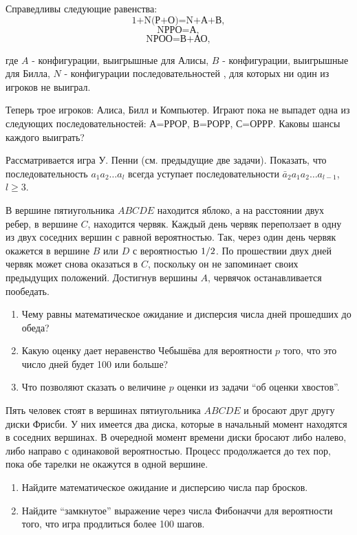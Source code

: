 \begin{ordre}

Справедливы следующие равенства:
\[
\mbox{1+N(Р+О)=N+А+В},
\]
\[
\mbox{NРРО=А},
\]
\[
\mbox{NРОО=В+АО},
\]

где $A$ - конфигурации, выигрышные для Алисы, $B$ -  конфигурации, выигрышные для Билла, $N$ - конфигурации последовательностей , для которых ни один из игроков не выиграл.

\end{ordre}


\begin{problem}
Теперь трое игроков: Алиса, Билл и Компьютер. Играют пока 
не выпадет одна из следующих последовательностей: А=РРОР, В=РОРР, С=ОРРР. 
Каковы шансы каждого выиграть?
\end{problem}


\begin{problem}
Рассматривается игра У. Пенни (см. предыдущие две задачи). Показать, что 
последовательность $a_1 a_2 \ldots a_l $ всегда уступает последовательности 
$\bar {a}_2 a_1 a_2 \ldots a_{l-1} $, $l\ge 3$.
\end{problem}


\begin{problem}
В вершине пятиугольника $ABCDE$ 
находится яблоко, а на расстоянии двух ребер, в вершине $C$, находится 
червяк. Каждый день червяк переползает в одну из двух соседних вершин с 
равной вероятностью. Так, через один день червяк окажется в вершине $B$ или 
$D$ с вероятностью $1 \mathord{\left/ {\vphantom {1 2}} \right. 
\kern-\nulldelimiterspace} 2$. По прошествии двух дней червяк может снова 
оказаться в $C$, поскольку он не запоминает своих предыдущих положений. 
Достигнув вершины $A$, червячок останавливается пообедать.

\begin{enumerate}
\item Чему равны математическое ожидание и дисперсия числа дней прошедших до обеда?
\item Какую оценку дает неравенство Чебышёва для вероятности $p$ того, что это число дней будет 100 или больше?
\item Что позволяют сказать о величине $p$ оценки из задачи ``об оценки хвостов''.
\end{enumerate}
\end{problem}


\begin{problem}
Пять человек стоят в вершинах пятиугольника $ABCDE$ и 
бросают друг другу диски Фрисби. У них имеется два диска, которые в 
начальный момент находятся в соседних вершинах. В очередной момент времени 
диски бросают либо налево, либо направо с одинаковой вероятностью. Процесс 
продолжается до тех пор, пока обе тарелки не окажутся в одной вершине.

\begin{enumerate}
\item Найдите математическое ожидание и дисперсию числа пар бросков.
\item Найдите ``замкнутое'' выражение через числа Фибоначчи для вероятности того, что игра продлиться более 100 шагов.
\end{enumerate}
\end{problem}


